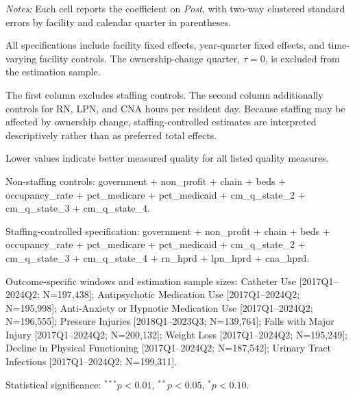 \begin{table}[!ht]
\begin{threeparttable}
\begin{tablenotes}[flushleft]
\footnotesize
\item \textit{Notes:} Each cell reports the coefficient on \textit{Post}, with two-way clustered standard errors by facility and calendar quarter in parentheses.
\item All specifications include facility fixed effects, year-quarter fixed effects, and time-varying facility controls. The ownership-change quarter, $\tau=0$, is excluded from the estimation sample.
\item The first column excludes staffing controls. The second column additionally controls for RN, LPN, and CNA hours per resident day. Because staffing may be affected by ownership change, staffing-controlled estimates are interpreted descriptively rather than as preferred total effects.
\item Lower values indicate better measured quality for all listed quality measures.
\item Non-staffing controls: government + non\_profit + chain + beds + occupancy\_rate + pct\_medicare + pct\_medicaid + cm\_q\_state\_2 + cm\_q\_state\_3 + cm\_q\_state\_4.
\item Staffing-controlled specification: government + non\_profit + chain + beds + occupancy\_rate + pct\_medicare + pct\_medicaid + cm\_q\_state\_2 + cm\_q\_state\_3 + cm\_q\_state\_4 + rn\_hprd + lpn\_hprd + cna\_hprd.
\item Outcome-specific windows and estimation sample sizes: Catheter Use [2017Q1--2024Q2; N=197,438]; Antipsychotic Medication Use [2017Q1--2024Q2; N=195,998]; Anti-Anxiety or Hypnotic Medication Use [2017Q1--2024Q2; N=196,555]; Pressure Injuries [2018Q1--2023Q3; N=139,764]; Falls with Major Injury [2017Q1--2024Q2; N=200,132]; Weight Loss [2017Q1--2024Q2; N=195,249]; Decline in Physical Functioning [2017Q1--2024Q2; N=187,542]; Urinary Tract Infections [2017Q1--2024Q2; N=199,311].
\item Statistical significance: $^{***}p<0.01$, $^{**}p<0.05$, $^{*}p<0.10$.
\end{tablenotes}
\end{threeparttable}
\end{table}

